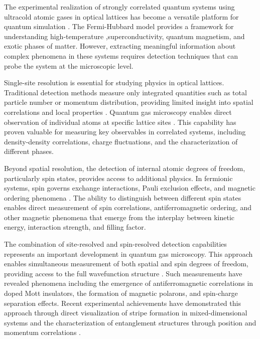 



The experimental realization of strongly correlated quantum systems using ultracold atomic gases in optical lattices has become a versatile platform for quantum simulation \cite{esslinger_fermi-hubbard_2010,gross_quantum_2017}. The Fermi-Hubbard model provides a framework for understanding high-temperature ,superconductivity, quantum magnetism, and exotic phases of matter. However, extracting meaningful information about complex phenomena in these systems requires detection techniques that can probe the system at the microscopic level.

Single-site resolution is essential for studying physics in optical lattices. Traditional detection methods measure only integrated quantities such as total particle number or momentum distribution, providing limited insight into spatial correlations and local properties \cite{gross_quantum_2021}. Quantum gas microscopy enables direct observation of individual atoms at specific lattice sites \cite{bakr_quantum_2009,sherson_single-atom-resolved_2010}. This capability has proven valuable for measuring key observables in correlated systems, including density-density correlations, charge fluctuations, and the characterization of different phases.

Beyond spatial resolution, the detection of internal atomic degrees of freedom, particularly spin states, provides access to additional physics. In fermionic systems, spin governs exchange interactions, Pauli exclusion effects, and magnetic ordering phenomena \cite{parsons_site-resolved_2016,boll_spin-_2016}. The ability to distinguish between different spin states enables direct measurement of spin correlations, antiferromagnetic ordering, and other magnetic phenomena that emerge from the interplay between kinetic energy, interaction strength, and filling factor.

The combination of site-resolved and spin-resolved detection capabilities represents an important development in quantum gas microscopy. This approach enables simultaneous measurement of both spatial and spin degrees of freedom, providing access to the full wavefunction structure \cite{mazurenko_cold-atom_2017}. Such measurements have revealed phenomena including the emergence of antiferromagnetic correlations in doped Mott insulators, the formation of magnetic polarons, and spin-charge separation effects. Recent experimental achievements have demonstrated this approach through direct visualization of stripe formation in mixed-dimensional systems \cite{bourgund_formation_2025} and the characterization of entanglement structures through position and momentum correlations \cite{bergschneider_experimental_2019}.

